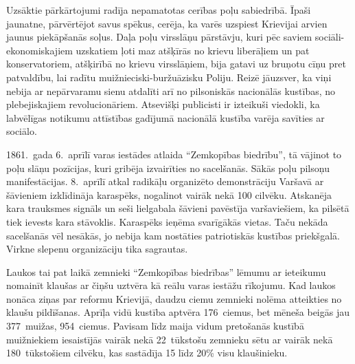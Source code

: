 \documentclass[twoside,a5paper,12pt,fleqn,openany]{extbook}
\begin{document}
Uzsāktie pārkārtojumi radīja nepamatotas cerības poļu sabiedrībā. Īpaši jaunatne, pārvērtējot savus spēkus, cerēja, ka varēs uzspiest Krievijai arvien jaunus piekāpšanās soļus. Daļa poļu virsslāņu pārstāvju, kuri pēc saviem sociāli-ekonomiskajiem uzskatiem ļoti maz atšķīrās no krievu liberāļiem un pat konservatoriem, atšķirībā no krievu virsslāņiem, bija gatavi uz bruņotu cīņu pret patvaldību, lai radītu muižnieciski-buržuāzisku Poliju. Reizē jāuzsver, ka viņi nebija ar nepārvaramu sienu atdalīti arī no pilsoniskās nacionālās kustības, no plebejiskajiem revolucionāriem. Atsevišķi publicisti ir izteikuši viedokli, ka labvēlīgas notikumu attīstības gadījumā nacionālā kustība varēja savīties ar sociālo.

1861.~gada 6.~aprīlī varas iestādes atlaida ``Zemkopības biedrību'', tā vājinot to poļu slāņu pozīcijas, kuri gribēja izvairīties no sacelšanās. Sākās poļu pilsoņu manifestācijas. 8.~aprīlī atkal radikāļu organizēto demonstrāciju Varšavā ar šāvieniem izklīdināja karaspēks, nogalinot vairāk nekā 100 cilvēku. Atskanēja kara trauksmes signāls un seši lielgabala šāvieni pavēstīja varšaviešiem, ka pilsētā tiek ievests kara stāvoklis. Karaspēks ieņēma svarīgākās vietas. Taču nekāda sacelšanās vēl nesākās, jo nebija kam nostāties patriotiskās kustības priekšgalā. Virkne slepenu organizāciju tika sagrautas.

Laukos tai pat laikā zemnieki ``Zemkopības biedrības'' lēmumu ar ieteikumu nomainīt klaušas ar čiņšu uztvēra kā reālu varas iestāžu rīkojumu. Kad laukos nonāca ziņas par reformu Krievijā, daudzu ciemu zemnieki nolēma atteikties no klaušu pildīšanas. Aprīļa vidū kustība aptvēra 176~ciemus, bet mēneša beigās jau 377~muižas, 954~ciemus. Pavisam līdz maija vidum pretošanās kustībā muižniekiem iesaistījās vairāk nekā 22~tūkstošu zemnieku sētu ar vairāk nekā 180~tūkstošiem cilvēku, kas sastādīja 15 līdz 20\% visu klaušinieku.
\end{document}
